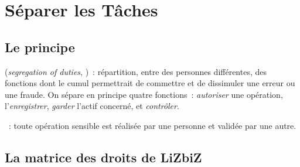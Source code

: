 \section{Séparer les Tâches}
\label{sec:c02-sod}

\subsection{Le principe}

\begin{boxdef}
(\textit{segregation of duties}, )~: répartition, entre des
personnes différentes, des fonctions dont le cumul permettrait de commettre
et de dissimuler une erreur ou une fraude. On sépare en principe quatre
fonctions~: \emph{autoriser} une opération, l'\emph{enregistrer},
\emph{garder} l'actif concerné, et \emph{contrôler}.

\medskip
{}~: toute
opération sensible est réalisée par une personne et validée par une autre.
\end{boxdef}

\subsection{La matrice des droits de LiZbiZ}

